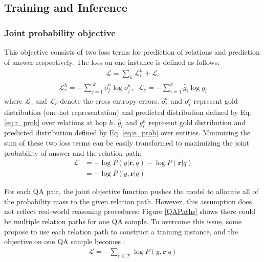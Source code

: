 

\subsection{Training and Inference}





\subsubsection{Joint probability objective} This objective consists of two loss terms for prediction of relations and prediction of answer respectively. The loss on one instance is defined as follows:
\begin{align}
 \mathcal{L} = \sum_{h}\mathcal{L}_r^{h} + \mathcal{L}_e 
 \end{align}
  \vspace{-3ex}
\begin{align}
 \mathcal{L}_r^{h} = -\sum_{j=1}^{\mathcal{R}}\hat{o}^h_j\log{o^h_j},\;\;\mathcal{L}_e = -\sum_{i=1}^{\mathcal{E}}\hat{g}_i\log{g_i}
\end{align}
where $\mathcal{L}_e$ and $\mathcal{L}_r$ denote the cross entropy errors. $\hat{o}^h_j$ and $o^h_j$ represent gold distribution (one-hot representation) and predicted distribution defined by Eq. \ref{eq:r_prob} over relations at hop $h$. $\hat{g}_i$ and $g^h_i$ represent gold distribution and predicted distribution defined by Eq. \ref{eq:e_prob} over entities. Minimizing the sum of these two loss terms can be easily transformed to maximizing the joint probability of answer and the relation path:
\begin{equation}
\begin{aligned}
\mathcal{L} &= -\log P(y|\mathbf{r},q) - \log P(\mathbf{r}|q) \\
            &= -\log P(y,\mathbf{r}|q)
\end{aligned}
\end{equation}

For each QA pair, the joint objective function pushes the model to allocate all of the probability mass to the given relation path. However, this assumption does not reflect real-world reasoning procedures: Figure \ref{QAPaths} shows there could be multiple relation paths for one QA sample. 
To overcome this issue, some propose to use each relation path to construct a training instance, and the objective on one QA sample becomes :
\begin{align}
\mathcal{L} = -\sum_{\mathbf{r}\in \mathcal{P}}\log P(y,\mathbf{r}|q)
\end{align}


